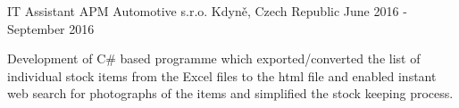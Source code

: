 \begin{cventries}
	\cventry
	{IT Assistant}
	{APM Automotive s.r.o.}
	{Kdyně, Czech Republic}
	{June 2016 - September 2016}
	{
		\begin{cvitems}
			\item {
				Development of C\# based programme which exported/converted the list of individual stock items from the Excel files
			 	to the html file and enabled instant web search for photographs of the items and simplified the stock keeping process.
			 }
		\end{cvitems}
	}
			
\end{cventries}